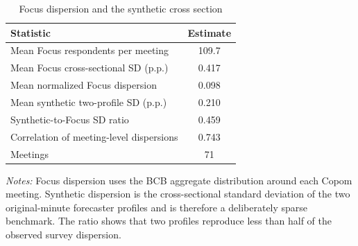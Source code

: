 \begin{table}[htbp]
\color{revisionred}
\centering
\begin{threeparttable}
\caption{Focus dispersion and the synthetic cross section}
\label{tab:focus-dispersion}
\begin{footnotesize}
\begin{tabular}{lc}
\toprule
Statistic & Estimate \\
\midrule
Mean Focus respondents per meeting & 109.7 \\
Mean Focus cross-sectional SD (p.p.) & 0.417 \\
Mean normalized Focus dispersion & 0.098 \\
Mean synthetic two-profile SD (p.p.) & 0.210 \\
Synthetic-to-Focus SD ratio & 0.459 \\
Correlation of meeting-level dispersions & 0.743 \\
Meetings & 71 \\
\bottomrule
\end{tabular}
\begin{tablenotes}[flushleft]
\scriptsize
\item \textit{Notes:} Focus dispersion uses the BCB aggregate distribution around each Copom meeting. Synthetic dispersion is the cross-sectional standard deviation of the two original-minute forecaster profiles and is therefore a deliberately sparse benchmark. The ratio shows that two profiles reproduce less than half of the observed survey dispersion.
\end{tablenotes}
\end{footnotesize}
\end{threeparttable}
\end{table}
